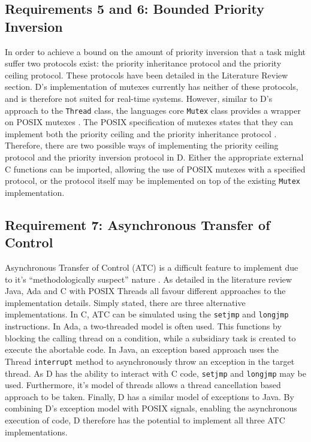 \subsection{Requirements 5 and 6: Bounded Priority Inversion} %
In order to achieve a bound on the amount of priority inversion that a task
might suffer two protocols exist: the priority inheritance protocol and the
priority ceiling protocol. These protocols have been detailed in the 
Literature Review section. D's implementation of mutexes currently has
neither of these protocols, and is therefore not suited for real-time systems.
However, similar to D's approach to the \texttt{Thread} class, the languages
core \texttt{Mutex} class provides a wrapper on POSIX mutexes
\cite{dlang-github-mutex}. The POSIX specification of mutexes states that
they can implement both the priority ceiling and the priority inheritance protocol 
\cite{mutex-setprotocol}. Therefore, there are two possible ways of
implementing the priority ceiling protocol and the priority inversion protocol
in D. Either the appropriate external C functions can be imported, allowing the
use of POSIX mutexes with a specified protocol, or the protocol itself may be
implemented on top of the existing \texttt{Mutex} implementation. 

\subsection{Requirement 7: Asynchronous Transfer of Control} %
Asynchronous Transfer of Control (ATC) is a difficult feature to implement due to
it's ``methodologically suspect'' nature \cite{Brosgol:2002:ATC}. As detailed
in the literature review Java, Ada and C with POSIX Threads all favour
different approaches to the implementation details. Simply stated, there are
three alternative implementations. In C, ATC can be simulated using the
\texttt{setjmp} and \texttt{longjmp} instructions. In Ada, a
two-threaded model is often used. This functions by blocking the calling thread
on a condition, while a subsidiary task is created to execute the abortable
code. In Java, an exception based approach uses the Thread \texttt{interrupt}
method to asynchronously throw an exception in the target thread. As D has the
ability to interact with C code, \texttt{setjmp} and \texttt{longjmp} may be
used. Furthermore, it's model of threads allows a thread cancellation based
approach to be taken. Finally, D has a similar model of exceptions to Java. By
combining D's exception model with POSIX signals, enabling the asynchronous
execution of code, D therefore has the potential to implement all three ATC
implementations. 
